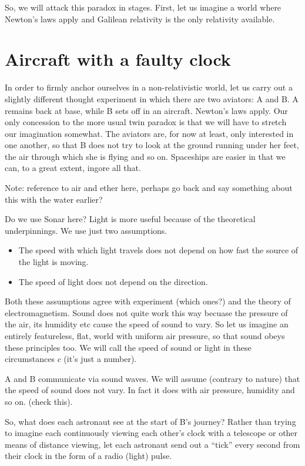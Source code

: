 \documentclass{report}
\begin{document}
So, we will attack this paradox in stages. First, let us imagine a world where Newton's laws apply and Galilean relativity is the only relativity available.

\section*{Aircraft with a faulty clock}
In order to firmly anchor ourselves in a non-relativistic world, let us carry out a slightly different thought experiment in which there are two aviators: A and B. A remains back at base, while B sets off in an aircraft. Newton's laws apply. Our only concession to the more usual twin paradox is that we will have to stretch our imagination somewhat. The aviators are, for now at least, only interested in one another, so that B does not try to look at the ground running under her feet, the air through which she is flying and so on. Spaceships are easier in that we can, to a great extent, ingore all that.

Note: reference to air and ether here, perhaps go back and say something about this with the water earlier?

Do we use Sonar here? Light is more useful because of the theoretical underpinnings. We use just two assumptions.
\begin{itemize}
\item The speed with which light travels does not depend on how fast the source of the light is moving.
\item The speed of light does not depend on the direction.
\end{itemize}

Both these assumptions agree with experiment (which ones?) and the theory of electromagnetism. Sound does not quite work this way becuase the pressure of the air, its humidity etc cause the speed of sound to vary. So let us imagine an entirely featureless, flat, world with uniform air pressure, so that sound obeys these principles too. We will call the speed of sound or light in these circumstances $c$ (it's just a number).

A and B communicate via sound waves. We will assume (contrary to nature) that the speed of sound does not vary. In fact it does with air pressure, humidity and so on. (check this).

So, what does each astronaut see at the start of B's journey? Rather than trying to imagine each continuously viewing each other's clock with a telescope or other means of distance viewing, let each astronaut send out a ``tick'' every second from their clock in the form of a radio (light) pulse.
\end{document}
